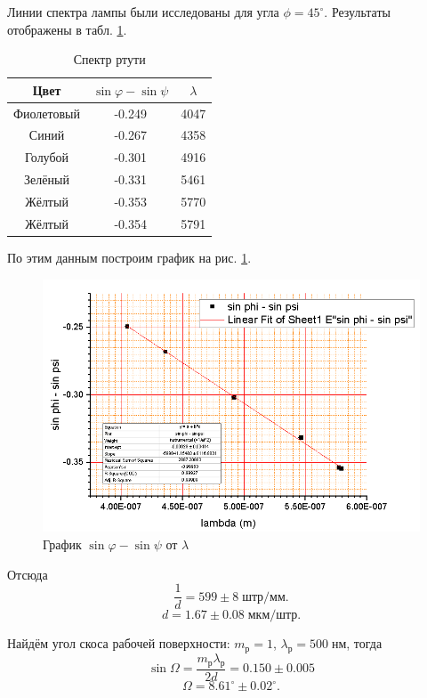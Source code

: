 \documentclass[a4paper]{article}
\begin{document}
Линии спектра лампы были исследованы для угла $ \phi = 45^\circ $. Результаты отображены в табл. \ref{tab:allspectre}.
\begin{table}[htb]
	\centering
\begin{tabular}{|c|c|c|}
	\hline
	Цвет       & $ \sin\varphi -\sin\psi $ & $ \lambda$ \\ \hline
	Фиолетовый & -0.249                  & 4047       \\ \hline
	Синий      & -0.267                   & 4358       \\ \hline
	Голубой    & -0.301                  & 4916       \\ \hline
	Зелёный    & -0.331                  & 5461       \\ \hline
	Жёлтый     & -0.353                  & 5770       \\ \hline
	Жёлтый     & -0.354                  & 5791       \\ \hline
\end{tabular}
\caption{Спектр ртути}
\label{tab:allspectre}
\end{table}

По этим данным построим график на рис. \ref{fig:screenshot1}.
\begin{figure}[tbp]
	\centering
	\includegraphics[width=0.8\linewidth]{Screenshot_1}
	\caption{График $\sin \varphi - \sin \psi$ от $\lambda$}
	\label{fig:screenshot1}
\end{figure}
Отсюда 
\begin{equation*}\label{key}
	\frac{1}{d} = 599 \pm 8\; штр/мм.
\end{equation*}
\begin{equation*}\label{key}
	d = 1.67 \pm 0.08 \; мкм/штр.
\end{equation*}

Найдём угол скоса рабочей поверхности: $ m_р = 1 $, $ \lambda_р = 500 \; нм $, тогда
\begin{equation*}\label{key}
	\sin \Omega = \frac{m_р \lambda_р}{2 d} = 0.150\pm 0.005
\end{equation*}
\begin{equation*}\label{key}
	\Omega = 8.61^\circ \pm 0.02^\circ.
\end{equation*}
\end{document}
